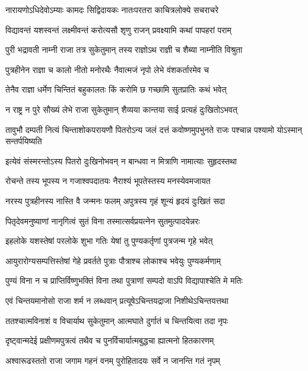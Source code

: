 \twolineshloka
{नारायणोऽधिदेवोऽम्याः कामदः सिद्विदायकः}
{नातःपरतरा काचित्रलोक्ये सचराचरे} %

\twolineshloka
{विद्यावन्तं यशस्वन्तं लक्ष्मीवन्तं करोत्यसौ}
{शृणु राजन् प्रवक्ष्यामि कथां पापहरां पराम्} %

\twolineshloka
{पुरी भद्रावती नाम्नी राजा तत्र सुकेतुमान्}
{तस्य राज्ञोऽथ राज्ञी च शैब्या नाम्नीति विश्रुता} %

\twolineshloka
{पुत्रहीनेन राज्ञा च कालो नीतो मनोरथैः}
{नैवात्मजं नृपो लेभे वंशकर्तारमेव च} %

\twolineshloka
{तेनैव राज्ञा धर्मेण चिन्तितं बहुकालतः}
{किं करोमि छ गच्छामि सुतप्रातिः कथं भवेत्} %

\twolineshloka
{न राष्ट्र न पुरे सौख्यं लेभे राजा सुकेतुमान्}
{शैव्यया कान्तया साई प्रत्यहं दुःखितोऽभवत्} %


\threelineshloka
{तावुभौ दम्पती नित्यं चिन्ताशोकपरायणौ}
{पितरोऽन्य जलं दत्तं कवोष्णमुपभुनते}
{राजः पश्चान्न पश्यामो योऽस्मान् सन्तर्पयिष्यति} %

\twolineshloka
{इत्येवं संस्मरन्तोऽस्य पितरो दुःखिनोभवन्}
{न बान्धवा न मित्राणि नामात्याः सुहृदस्तथा} %

\twolineshloka
{रोचन्ते तस्य भूपस्य न गजाश्वपदातयः}
{नैराश्यं भूपतेस्तस्य मनस्येवमजायत} %

\twolineshloka
{नरस्य पुत्रहीनस्य नास्ति वै जन्मनः फलम्}
{अपुत्रस्य गृहं शून्यं हृदयं दुःखितं सदा} %

\twolineshloka
{पितृदेवमनुष्याणां नानृगित्वं सुतं विना}
{तस्मात्सर्वप्रयत्नेन सुतमुत्पादयेन्नरः} %

\twolineshloka
{इहलोके यशस्तेषां परलोके शुभा गतिः}
{येषां तु पुण्यकर्तृणां पुत्रजन्म गृहे भवेत्} %

\twolineshloka
{आयुरारोग्यसम्पत्तिस्तेषां गेहे प्रवर्तते}
{पुत्राः पौत्राश्च लोकाश्च भवेयुः पुण्यकर्मणाम्} %

\twolineshloka
{पुण्यं विना न च प्राप्तिर्विष्णुभक्तिं विना तथा}
{पुत्राणां सम्पदो वाऽपि विद्यापाश्चेति मे मतिः} %

\twolineshloka
{एवं चिन्तयमानोसो राजा शर्म न लब्धवान्}
{प्रत्यूषेऽचिन्तयद्राजा निशीथेऽचिन्तयत्तथा} %

\twolineshloka
{ततश्चात्मविनाशं व विचार्याथ सुकेतुमान्}
{आत्मघाते दुर्गातं च चिन्तयित्वा तदा नृपः} %

\twolineshloka
{दृष्ट्वान्मदेई प्रक्षीणमपुत्रत्वं तथैव च}
{पुनर्विचार्यात्मबुद्धचा ह्यात्मनो हितकारणम्} %

\twolineshloka
{अश्वारूढस्ततो राजा जगाम गहनं वनम्}
{पुरोहितादयः सर्वे न जानन्ति गतं नृपम्} %

